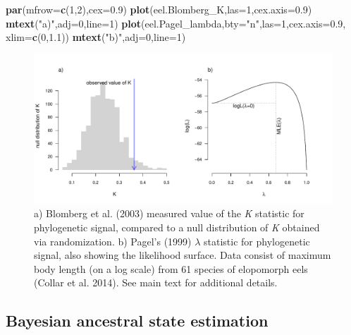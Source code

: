\documentclass[fleqn,10pt,lineno]{wlpeerj} %
\newenvironment{Shaded}{\begin{snugshade}}{\end{snugshade}}
\newcommand{\AttributeTok}[1]{\textcolor[rgb]{0.13,0.29,0.53}{#1}}
\newcommand{\DecValTok}[1]{\textcolor[rgb]{0.00,0.00,0.81}{#1}}
\newcommand{\FloatTok}[1]{\textcolor[rgb]{0.00,0.00,0.81}{#1}}
\newcommand{\FunctionTok}[1]{\textcolor[rgb]{0.13,0.29,0.53}{\textbf{#1}}}
\newcommand{\NormalTok}[1]{#1}
\newcommand{\StringTok}[1]{\textcolor[rgb]{0.31,0.60,0.02}{#1}}
\begin{document}
\begin{Shaded}
\begin{Highlighting}[]
\FunctionTok{par}\NormalTok{(}\AttributeTok{mfrow=}\FunctionTok{c}\NormalTok{(}\DecValTok{1}\NormalTok{,}\DecValTok{2}\NormalTok{),}\AttributeTok{cex=}\FloatTok{0.9}\NormalTok{)}
\FunctionTok{plot}\NormalTok{(eel.Blomberg\_K,}\AttributeTok{las=}\DecValTok{1}\NormalTok{,}\AttributeTok{cex.axis=}\FloatTok{0.9}\NormalTok{)}
\FunctionTok{mtext}\NormalTok{(}\StringTok{"a)"}\NormalTok{,}\AttributeTok{adj=}\DecValTok{0}\NormalTok{,}\AttributeTok{line=}\DecValTok{1}\NormalTok{)}
\FunctionTok{plot}\NormalTok{(eel.Pagel\_lambda,}\AttributeTok{bty=}\StringTok{"n"}\NormalTok{,}\AttributeTok{las=}\DecValTok{1}\NormalTok{,}\AttributeTok{cex.axis=}\FloatTok{0.9}\NormalTok{,}
  \AttributeTok{xlim=}\FunctionTok{c}\NormalTok{(}\DecValTok{0}\NormalTok{,}\FloatTok{1.1}\NormalTok{))}
\FunctionTok{mtext}\NormalTok{(}\StringTok{"b)"}\NormalTok{,}\AttributeTok{adj=}\DecValTok{0}\NormalTok{,}\AttributeTok{line=}\DecValTok{1}\NormalTok{)}
\end{Highlighting}
\end{Shaded}

\begin{figure}
\includegraphics[width=1\linewidth]{Revell.phytools-v2_peerj_files/figure-latex/phylosig-1} \caption{a) Blomberg et al. (2003) measured value of the \textit{K} statistic for phylogenetic signal, compared to a null distribution of \textit{K} obtained via randomization. b) Pagel's (1999) $\lambda$ statistic for phylogenetic signal, also showing the likelihood surface. Data consist of maximum body length (on a log scale) from 61 species of elopomorph eels (Collar et al. 2014). See main text for additional details.}\label{fig:phylosig}
\end{figure}

\hypertarget{bayesian-ancestral-state-estimation}{%
\subsection{Bayesian ancestral state estimation}\label{bayesian-ancestral-state-estimation}}
\end{document}
